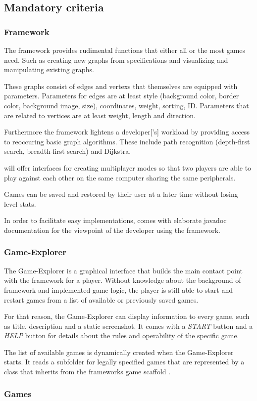 \subsection{Mandatory criteria}
\label{mandatory-criteria}
\subsubsection{Framework}
The framework provides rudimental functions that either all or the most games need. Such as creating new graphs from specifications and visualizing and manipulating existing graphs.\par
These graphs consist of \glspl{edge} and \glspl{vertex} that themselves are equipped with parameters. Parameters for edges are at least style (background color, border color, background image, size), coordinates, weight, sorting, \gls{ID}. Parameters that are related to vertices are at least weight, length and direction.\par
Furthermore the framework lightens a \gls{developer}['s] workload by providing access to reoccuring basic graph algorithms. These include path recognition (depth-first search, breadth-first search) and Dijkstra.\par {}
\graphioli will offer interfaces for creating multiplayer modes so that two \glspl{player} are able to play against each other on the same computer sharing the same peripherals.\par
Games can be saved and restored by their user at a later time without losing \gls{level} stats.\par
In order to facilitate easy implementations, \graphioli comes with elaborate \Gls{javadoc} documentation for the viewpoint of the developer using the framework.\par {}

\subsubsection{Game-Explorer}
The Game-Explorer is a graphical interface that builds the main contact point with the framework for a player. Without knowledge about the background of framework and implemented game logic, the player is still able to start and restart games from a list of available or previously saved games.\par
For that reason, the Game-Explorer can display information to every game, such as title, description and a static screenshot. It comes with a \emph{START} button  and a \emph{HELP} button for details about the rules and operability of the specific game.\par
The list of available games is dynamically created when the Game-Explorer starts. It reads a subfolder for legally specified games that are represented by a class that inherits from the frameworks game scaffold .

\subsubsection{Games}
